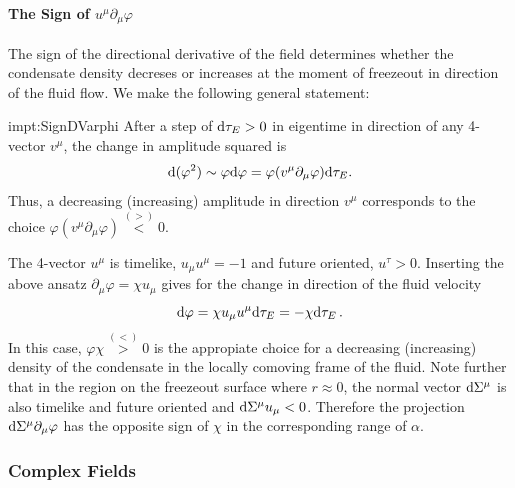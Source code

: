 \paragraph{The Sign of $u^\mu\partial_\mu\varphi$}

The sign of the directional derivative of the field determines whether the condensate density decreses or increases at the moment of freezeout in direction of the fluid flow. We make the following general statement:
\begin{impt}{impt:SignDVarphi}
    After a step of ${\text{d}\tau_E>0}$ in eigentime in direction of any 4-vector $v^\mu$, the change in amplitude squared is
    \begin{equation}
        \text{d}(\varphi^2)\sim\varphi\text{d}\varphi=\varphi(v^\mu\partial_\mu\varphi)\text{d}\tau_E.
    \end{equation}
    Thus, a decreasing (increasing) amplitude in direction $v^\mu$ corresponds to the choice ${\varphi(v^\mu\partial_\mu\varphi)\overset{(>)}{<}0}$.
\end{impt}

The 4-vector $u^\mu$ is timelike, ${u_\mu u^\mu=-1}$ and future oriented, $u^\tau>0$. Inserting the above ansatz ${\partial_\mu\varphi=\chi u_\mu}$ gives for the change in direction of the fluid velocity
\begin{equation}
    \text{d}\varphi=\chi u_\mu u^\mu\text{d}\tau_E=-\chi\text{d}\tau_E\,.
\end{equation}
In this case, ${\varphi\chi\overset{(<)}{>}0}$ is the appropiate choice for a decreasing (increasing) density of the condensate in the locally comoving frame of the fluid. Note further that in the region on the freezeout surface where $r\approx 0$, the normal vector ${\text{d}\Sigma^\mu}$ is also timelike and future oriented and ${\text{d}\Sigma^\mu u_\mu<0}$. Therefore the projection ${\text{d}\Sigma^\mu\partial_\mu\varphi}$ has the opposite sign of $\chi$ in the corresponding range of $\alpha$.

\subsubsection{Complex Fields}

